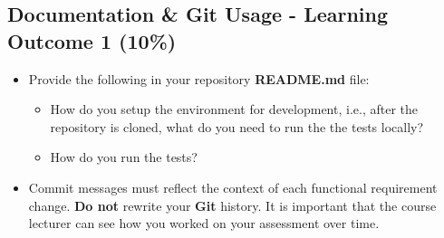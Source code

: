 \documentclass{article}
\begin{document}
\subsection*{Documentation \& Git Usage - Learning Outcome 1 (10\%)}
\begin{itemize}
    \item Provide the following in your repository \textbf{README.md} file:
    \begin{itemize}
        \item How do you setup the environment for development, i.e., after the repository is cloned, what do you need to run the the tests locally?
        \item How do you run the tests?
    \end{itemize}
\end{itemize}
\begin{itemize}
    \item Commit messages must reflect the context of each functional requirement change. \textbf{Do not} rewrite your \textbf{Git} history. It is important that the course lecturer can see how you worked on your assessment over time.
\end{itemize}
\end{document}
